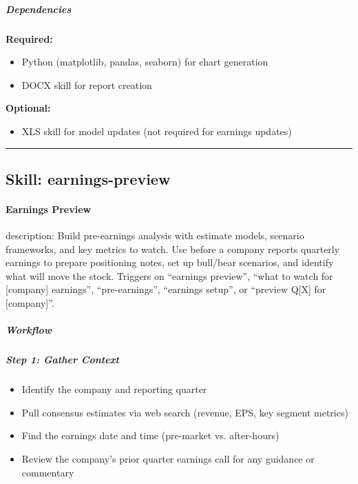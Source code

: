 \documentclass[11pt]{article}
\begin{document}
\subparagraph{Dependencies}\mbox{}\par

\textbf{Required:}

\begin{itemize}[leftmargin=*,itemsep=2pt,topsep=2pt]
\item {} Python (matplotlib, pandas, seaborn) for chart generation
\item {} DOCX skill for report creation
\end{itemize}

\textbf{Optional:}

\begin{itemize}[leftmargin=*,itemsep=2pt,topsep=2pt]
\item {} XLS skill for model updates (not required for earnings updates)
\end{itemize}

\vspace{0.8em}\hrule\vspace{0.8em}

\subsection{Skill: earnings-preview}\label{file:skills-earnings-preview-SKILL-md}

\paragraph{Earnings Preview}\mbox{}\par

description: Build pre-earnings analysis with estimate models, scenario frameworks, and key metrics to watch. Use before a company reports quarterly earnings to prepare positioning notes, set up bull/bear scenarios, and identify what will move the stock. Triggers on ``earnings preview'', ``what to watch for [company] earnings'', ``pre-earnings'', ``earnings setup'', or ``preview Q[X] for [company]''.


\subparagraph{Workflow}\mbox{}\par

\subparagraph{Step 1: Gather Context}\mbox{}\par

\begin{itemize}[leftmargin=*,itemsep=2pt,topsep=2pt]
\item {} Identify the company and reporting quarter
\item {} Pull consensus estimates via web search (revenue, EPS, key segment metrics)
\item {} Find the earnings date and time (pre-market vs. after-hours)
\item {} Review the company's prior quarter earnings call for any guidance or commentary
\end{itemize}
\end{document}
